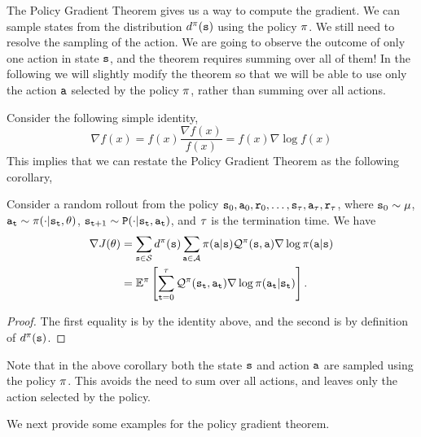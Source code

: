 The Policy Gradient Theorem gives us a way to compute the gradient.
We can sample states from the distribution $d^{\pi}({\tt s})$ using the
policy $\pi$. We still need to resolve the sampling of the
action. We are going to observe the outcome of only one action in
state ${\tt s}$, and the theorem requires summing over all of them!
In the following we will slightly modify the theorem so that we will
be able to use only the action ${\tt a}$ selected by the policy
$\pi$, rather than summing over all actions.

Consider the following simple identity,
\[
\nabla f(x)=f(x)\frac{\nabla f(x)}{f(x)}=f(x)\nabla \log f(x)
\]
This implies that we can restate the Policy Gradient Theorem as the
following corollary,
\begin{corollary} 
\label{thm:policy-gradient-corr} Consider a random rollout from the policy ${\tt s}_0,{\tt a}_0,{\tt r}_0,\dots,{\tt s}_\tau, {\tt a}_\tau, {\tt r}_\tau$, where ${\tt s}_0 \sim \mu$, ${\tt a}_{\tt t}\sim \pi(\cdot|{\tt s}_{\tt t},\theta)$, ${\tt s}_{{\tt t}+1} \sim {\tt P} (\cdot | {\tt s}_{\tt t}, {\tt a}_{\tt t})$, and $\tau$ is the termination time. We have
\begin{equation*}
\begin{split}
\nabla J(\theta) &= \sum_{{\tt s} \in \mathcal{S}} d^{\pi}({\tt s}) \sum_{{\tt a}\in
\mathcal{A}} \pi({\tt a}|{\tt s}) \mathcal{Q}^\pi
({\tt s},{\tt a}) \nabla \log \pi({\tt a}|{\tt s}) \\
&=\mathbb{E}^\pi\left[\sum_{{\tt t}=0}^{\tau}\mathcal{Q}^\pi ({\tt s}_{\tt t},{\tt a}_{\tt t})\nabla \log
\pi({\tt a}_{\tt t}|{\tt s}_{\tt t})\right].    
\end{split}
\end{equation*}
\end{corollary}
\begin{proof}
    The first equality is by the identity above, and the second is by definition of $d^{\pi}({\tt s})$.
\end{proof}
Note that in the above corollary both the state ${\tt s}$ and action
${\tt a}$ are sampled using the policy $\pi$. This avoids the need to sum over all actions, and leaves only the action selected by the policy.

We next provide some examples for the policy gradient theorem.

